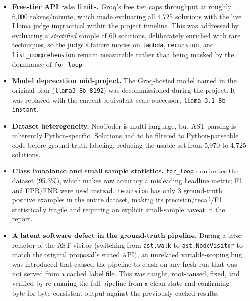 \documentclass{article}
\begin{document}
\begin{itemize}[leftmargin=*]

\item \textbf{Free-tier API rate limits.} Groq's free tier caps throughput at
  roughly 6{,}000 tokens/minute, which made evaluating all 4{,}725 solutions
  with the live Llama judge impractical within the project timeline. This was
  addressed by evaluating a \emph{stratified} sample of 60 solutions,
  deliberately enriched with rare techniques, so the judge's failure modes on
  \texttt{lambda}, \texttt{recursion}, and \texttt{list\_comprehension} remain
  measurable rather than being masked by the dominance of \texttt{for\_loop}.

\item \textbf{Model deprecation mid-project.} The Groq-hosted model named in
  the original plan (\texttt{llama3-8b-8192}) was decommissioned during the
  project. It was replaced with the current equivalent-scale successor,
  \texttt{llama-3.1-8b-instant}.

\item \textbf{Dataset heterogeneity.} NeoCoder is multi-language, but AST
  parsing is inherently Python-specific. Solutions had to be filtered to
  Python-parseable code before ground-truth labeling, reducing the usable set
  from 5{,}970 to 4{,}725 solutions.

\item \textbf{Class imbalance and small-sample statistics.} \texttt{for\_loop}
  dominates the dataset (95.3\%), which makes raw accuracy a misleading
  headline metric; F1 and FPR/FNR were used instead. \texttt{recursion} has
  only 3 ground-truth positive examples in the entire dataset, making its
  precision/recall/F1 statistically fragile and requiring an explicit
  small-sample caveat in the report.

\item \textbf{A latent software defect in the ground-truth pipeline.} During
  a later refactor of the AST visitor (switching from \texttt{ast.walk} to
  \texttt{ast.NodeVisitor} to match the original proposal's stated API), an
  unrelated variable-scoping bug was introduced that caused the pipeline to
  crash on any fresh run that was not served from a cached label file. This
  was caught, root-caused, fixed, and verified by re-running the full
  pipeline from a clean state and confirming byte-for-byte-consistent output
  against the previously cached results.


\end{itemize}
\end{document}
